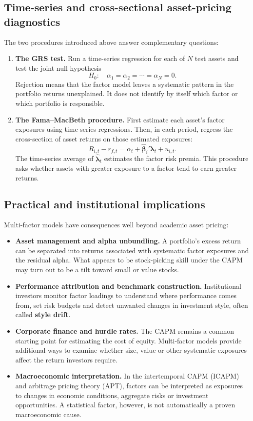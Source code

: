 \subsection{Time-series and cross-sectional asset-pricing diagnostics}

The two procedures introduced above answer complementary questions:
\begin{enumerate}
  \item \textbf{The GRS test.} Run a time-series regression for each of $N$ test assets and test the joint null hypothesis
  \[
    H_0:\quad \alpha_1=\alpha_2=\cdots=\alpha_N=0.
  \]
  Rejection means that the factor model leaves a systematic pattern in the portfolio returns unexplained. It does not identify by itself which factor or which portfolio is responsible.
  \item \textbf{The Fama--MacBeth procedure.} First estimate each asset's factor exposures using time-series regressions. Then, in each period, regress the cross-section of asset returns on those estimated exposures:
  \begin{equation}
    R_{i,t}-r_{f,t}=\alpha_t+\hat{\boldsymbol{\beta}}_i'\boldsymbol{\lambda}_t+u_{i,t}.
    \label{eq:03-fama-macbeth}
  \end{equation}
  The time-series average of $\hat{\boldsymbol{\lambda}}_t$ estimates the factor risk premia. This procedure asks whether assets with greater exposure to a factor tend to earn greater returns.
\end{enumerate}

\subsection{Practical and institutional implications}

Multi-factor models have consequences well beyond academic asset pricing:
\begin{itemize}
  \item \textbf{Asset management and alpha unbundling.} A portfolio's excess return can be separated into returns associated with systematic factor exposures and the residual alpha. What appears to be stock-picking skill under the CAPM may turn out to be a tilt toward small or value stocks.
  \item \textbf{Performance attribution and benchmark construction.} Institutional investors monitor factor loadings to understand where performance comes from, set risk budgets and detect unwanted changes in investment style, often called \textbf{style drift}.
  \item \textbf{Corporate finance and hurdle rates.} The CAPM remains a common starting point for estimating the cost of equity. Multi-factor models provide additional ways to examine whether size, value or other systematic exposures affect the return investors require.
  \item \textbf{Macroeconomic interpretation.} In the intertemporal CAPM (ICAPM) and arbitrage pricing theory (APT), factors can be interpreted as exposures to changes in economic conditions, aggregate risks or investment opportunities. A statistical factor, however, is not automatically a proven macroeconomic cause.
\end{itemize}

